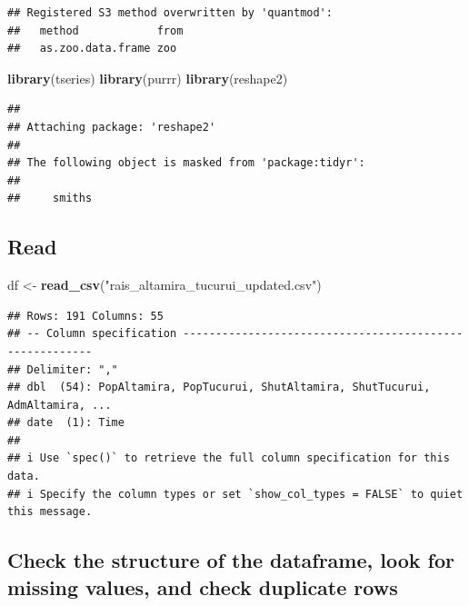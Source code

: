 \documentclass[
]{article}
\newenvironment{Shaded}{\begin{snugshade}}{\end{snugshade}}
\newcommand{\FunctionTok}[1]{\textcolor[rgb]{0.13,0.29,0.53}{\textbf{#1}}}
\newcommand{\NormalTok}[1]{#1}
\newcommand{\OtherTok}[1]{\textcolor[rgb]{0.56,0.35,0.01}{#1}}
\newcommand{\StringTok}[1]{\textcolor[rgb]{0.31,0.60,0.02}{#1}}
\begin{document}
\begin{verbatim}
## Registered S3 method overwritten by 'quantmod':
##   method            from
##   as.zoo.data.frame zoo
\end{verbatim}

\begin{Shaded}
\begin{Highlighting}[]
\FunctionTok{library}\NormalTok{(tseries)}
\FunctionTok{library}\NormalTok{(purrr)}
\FunctionTok{library}\NormalTok{(reshape2)}
\end{Highlighting}
\end{Shaded}

\begin{verbatim}
## 
## Attaching package: 'reshape2'
## 
## The following object is masked from 'package:tidyr':
## 
##     smiths
\end{verbatim}

\hypertarget{read}{%
\subsection{Read}\label{read}}

\begin{Shaded}
\begin{Highlighting}[]
\NormalTok{df }\OtherTok{\textless{}{-}} \FunctionTok{read\_csv}\NormalTok{(}\StringTok{"rais\_altamira\_tucurui\_updated.csv"}\NormalTok{)}
\end{Highlighting}
\end{Shaded}

\begin{verbatim}
## Rows: 191 Columns: 55
## -- Column specification --------------------------------------------------------
## Delimiter: ","
## dbl  (54): PopAltamira, PopTucurui, ShutAltamira, ShutTucurui, AdmAltamira, ...
## date  (1): Time
## 
## i Use `spec()` to retrieve the full column specification for this data.
## i Specify the column types or set `show_col_types = FALSE` to quiet this message.
\end{verbatim}

\hypertarget{check-the-structure-of-the-dataframe-look-for-missing-values-and-check-duplicate-rows}{%
\subsection{Check the structure of the dataframe, look for missing
values, and check duplicate
rows}\label{check-the-structure-of-the-dataframe-look-for-missing-values-and-check-duplicate-rows}}
\end{document}
